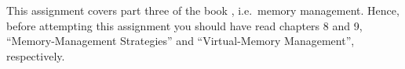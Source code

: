 This assignment covers part three of the book 
\cite{Silberschatz2013intl,Silberschatz2013osc}, i.e.\ memory management.
Hence, before attempting this assignment you should have read chapters 8 and 9, 
``Memory-Management Strategies'' and ``Virtual-Memory Management'', 
respectively.
